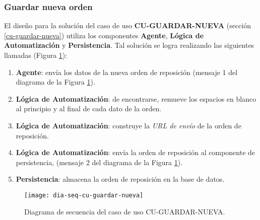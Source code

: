 \subsubsection{Guardar nueva orden}
El diseño para la solución del caso de uso \textbf{CU-GUARDAR-NUEVA} (sección \ref{cu-guardar-nueva}) utiliza los componentes \textbf{Agente}, \textbf{Lógica de Automatización} y \textbf{Persistencia}. Tal solución se logra realizando las siguientes llamadas (Figura \ref{fig:dia-seq-cu-guardar-nueva}):
\begin{enumerate}
	\item \textbf{Agente}: envía los datos de la nueva orden de reposición (mensaje 1 del diagrama de la Figura \ref{fig:dia-seq-cu-guardar-nueva}).
	\item \textbf{Lógica de Automatización}: de encontrarse, remueve los espacios en blanco al principio y al final de cada dato de la orden.
	\item \textbf{Lógica de Automatización}: construye la \textit{URL de envío} de la orden de reposición.
	\item \textbf{Lógica de Automatización}: envía la orden de reposición al componente de persistencia, (mensaje 2 del diagrama de la Figura \ref{fig:dia-seq-cu-guardar-nueva}).
	\item \textbf{Persistencia}: almacena la orden de reposición en la base de datos.
\end{enumerate}

\begin{figure}[h]
	\centering
	\texttt{[image: dia-seq-cu-guardar-nueva]}
	\caption{Diagrama de secuencia del caso de uso CU-GUARDAR-NUEVA.}
	\label{fig:dia-seq-cu-guardar-nueva}
\end{figure}

